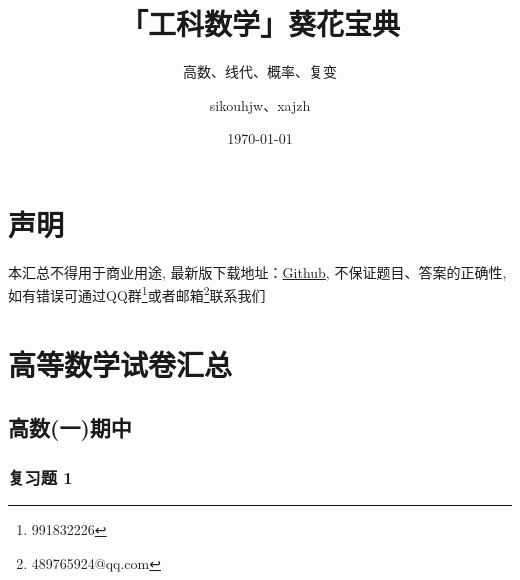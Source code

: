 \documentclass[cn,11pt,fancy,hide]{elegantbook}
\title{「工科数学」葵花宝典}
\subtitle{高数、线代、概率、复变}
\author{sikouhjw、xajzh}
\institute{临时组织起来的重排小组}
\date{\today}
\begin{document}
\maketitle
\tableofcontents


\mainmatter
\hypersetup{pageanchor=true}
\chapter{声明}
本汇总不得用于商业用途, 最新版下载地址：\href{https://github.com/sikouhjw/Mathematical-rearrangement}{Github}, 不保证题目、答案的正确性, 如有错误可通过QQ群\footnote{991832226}或者邮箱\footnote{489765924@qq.com}联系我们

\chapter{高等数学试卷汇总}

\section{高数(一)期中}

\subsection{复习题 1}
\end{document}
